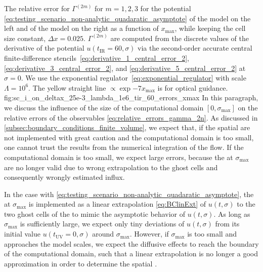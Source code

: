 	{%
		The relative error for $\Gamma^{(2m)}$ for $m = 1, 2, 3$ for the \uv{} potential \eqref{eq:testing_scenario_non-analytic_quadaratic_asymptote} of the  model on the left  and of the  model on the right  as a function of $x_\mathrm{max}$, while keeping the cell size constant, $\Delta x = 0.025$. $\Gamma^{(2m)}$ are computed from the discrete values of the derivative of the \ir{} potential $u ( t_\mathrm{IR} = 60, \sigma )$ via the second-order accurate central finite-difference stencils~\eqref{eq:derivative_1_central_error_2}, \eqref{eq:derivative_3_central_error_2}, and \eqref{eq:derivative_5_central_error_2} at $\sigma = 0$.
		We use the exponential regulator~\eqref{eq:exponential_regulator} with \uv{} scale $\Lambda = 10^6$.
		The yellow straight line $\propto\exp{-7x_\mathrm{max}}$ is for optical guidance.
	}%
	{fig:sc_i_on_deltax_25e-3_lambda_1e6_tir_60_errors_xmax}%
In this paragraph, we discuss the influence of the size of the computational domain $[ 0, \sigma_\mathrm{max} ]$ on the relative errors of the \ir{} observables \eqref{eq:relative_errors_gamma_2n}.
As discussed in \cref{subsec:boundary_conditions_finite_volume}, we expect that, if the spatial \bcs{} are not implemented with great caution and the computational domain is too small, one cannot trust the results from the numerical integration of the \frg{} flow.
If the computational domain is too small, we expect large errors, because the \bcs{} at $\sigma_\mathrm{max}$ are no longer valid due to wrong extrapolation to the ghost cells and consequently wrongly estimated influx.

In the case with \uv{} \ic{} \eqref{eq:testing_scenario_non-analytic_quadaratic_asymptote}, the \bc{} at $\sigma_\mathrm{max}$ is implemented as a linear extrapolation \eqref{eq:BClinExt} of $u ( t, \sigma )$ to the two ghost cells of the \ktScheme{} to mimic the asymptotic behavior of $u ( t, \sigma )$. 
As long as $\sigma_\mathrm{max}$ is sufficiently large, we expect only tiny deviations of $u ( t, \sigma )$ from its initial \uv{} value $u ( t_\mathrm{UV} = 0, \sigma )$ around $\sigma_\mathrm{max}$.
However, if $\sigma_\mathrm{max}$ is too small and approaches the model scales, we expect the diffusive effects to reach the boundary of the computational domain, such that a linear extrapolation is no longer a good approximation in order to determine the spatial \bc{}.

